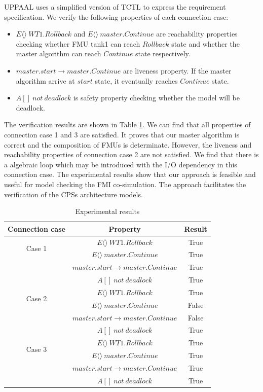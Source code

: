 UPPAAL uses a simplified version of TCTL \cite{BouchenebGR09} to express the requirement specification. We verify the following properties of each connection case:
\begin{itemize}
\item
$E\langle\rangle~WT1.Rollback$ and $E\langle\rangle~master.Continue$ are reachability properties checking whether FMU tank1 can reach $Rollback$ state and whether the master algorithm can reach $Continue$ state respectively.
\item
$master.start \rightarrow master.Continue$ are liveness property. If the master algorithm arrive at $start$ state, it eventually reaches $Continue$ state.
\item 
$A[]~not~deadlock$ is safety property checking whether the model will be deadlock.
\end{itemize}

The verification results are shown in Table \ref{rs}. We can find that all properties of connection case 1 and 3 are satisfied. It proves that our master algorithm is correct and the composition of FMUs is determinate. However, the liveness and reachability properties of connection case 2 are not satisfied. We find that there is a algebraic loop which may be introduced with the I/O dependency in this connection case. The experimental results show that our approach is feasible and useful for model checking the FMI co-simulation. The approach facilitates the verification of the CPSs architecture models.
\begin{table}
\caption{Experimental results}
\centering
\begin{tabular}{c c c} 
        \hline  
        Connection case & Property & Result\\
        \hline
        \multirow{2}{2.0cm}{Case 1}  
                & $E\langle\rangle~WT1.Rollback$ & True\\ 
                & $E\langle\rangle~master.Continue$ & True\\ 
                & $master.start\rightarrow master.Continue$ & True\\ 
                & $A[]~not~deadlock$ & True\\   
        \hline 
        \multirow{2}{2.0cm}{Case 2}  
                & $E\langle\rangle~WT1.Rollback$ & True\\ 
                & $E\langle\rangle~master.Continue$ & False\\ 
                & $master.start\rightarrow master.Continue$ & False\\ 
                & $A[]~not~deadlock$ & True\\   
        \hline 
        \multirow{2}{2.0cm}{Case 3}  
                & $E\langle\rangle~WT1.Rollback$ & True\\ 
                & $E\langle\rangle~master.Continue$ & True\\ 
                & $master.start \rightarrow master.Continue$ & True\\ 
                & $A[]~not~deadlock$ & True\\   
        \hline 
\end{tabular} 
\label{rs}
\end{table}




